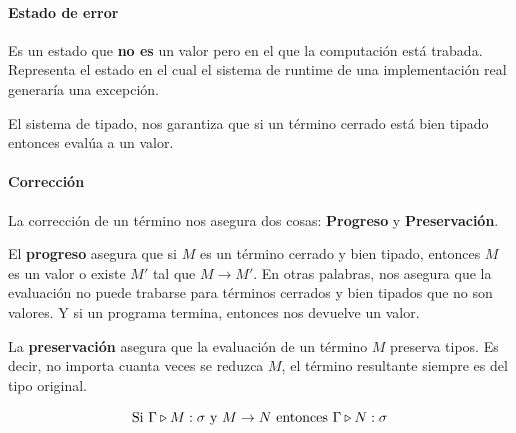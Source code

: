 \paragraph{Estado de error} Es un estado que \textbf{no es} un valor pero en el que la computación está trabada. Representa el estado en el cual el sistema de runtime de una implementación real generaría una excepción.

El sistema de tipado, nos garantiza que si un término cerrado está bien tipado entonces evalúa a un valor.


 \paragraph{Corrección}
La corrección de un término nos asegura dos cosas:	\textbf{Progreso} y \textbf{Preservación}.

El \textbf{progreso} asegura que si $M$ es un término cerrado y bien tipado, entonces $M$ es un valor o existe $M'$ tal que $M\to M'$. En otras palabras, nos asegura que la evaluación no puede trabarse para términos cerrados y bien tipados que no son valores. Y si un programa termina, entonces nos devuelve un valor.

La \textbf{preservación} asegura que la evaluación de un término $M$ preserva tipos. Es decir, no importa cuanta veces se reduzca $M$, el término resultante siempre es del tipo original.

$$\text{Si } \Gamma\triangleright M : \sigma \text{ y } M\to N \text{ entonces } \Gamma\triangleright N : \sigma$$	


